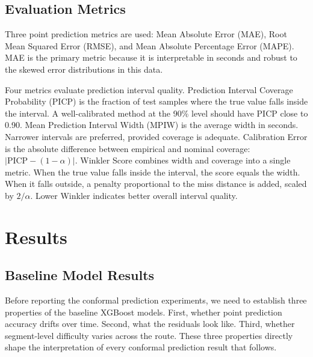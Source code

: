 \documentclass[12pt, a4paper, oneside]{report}
\begin{document}
\section{Evaluation Metrics}
\label{sec:evaluation_metrics}

Three point prediction metrics are used: Mean Absolute Error (MAE), Root Mean Squared Error (RMSE), and Mean Absolute Percentage Error (MAPE). MAE is the primary metric because it is interpretable in seconds and robust to the skewed error distributions in this data.

Four metrics evaluate prediction interval quality. Prediction Interval Coverage Probability (PICP) is the fraction of test samples where the true value falls inside the interval. A well-calibrated method at the 90\% level should have PICP close to 0.90. Mean Prediction Interval Width (MPIW) is the average width in seconds. Narrower intervals are preferred, provided coverage is adequate. Calibration Error is the absolute difference between empirical and nominal coverage: $|\text{PICP} - (1-\alpha)|$. Winkler Score combines width and coverage into a single metric. When the true value falls inside the interval, the score equals the width. When it falls outside, a penalty proportional to the miss distance is added, scaled by $2/\alpha$. Lower Winkler indicates better overall interval quality.



\chapter{Results}
\label{ch:results}



\section{Baseline Model Results}
\label{sec:baseline_results}

Before reporting the conformal prediction experiments, we need to establish three properties of the baseline XGBoost models. First, whether point prediction accuracy drifts over time. Second, what the residuals look like. Third, whether segment-level difficulty varies across the route. These three properties directly shape the interpretation of every conformal prediction result that follows.
\end{document}
